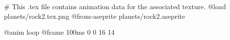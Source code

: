# This .tex file contains animation data for the associated texture.
@load planets/rock2.tex.png
@from-aseprite planets/rock2.aseprite

@anim loop
	@frame 100ms 0 0 16 14
